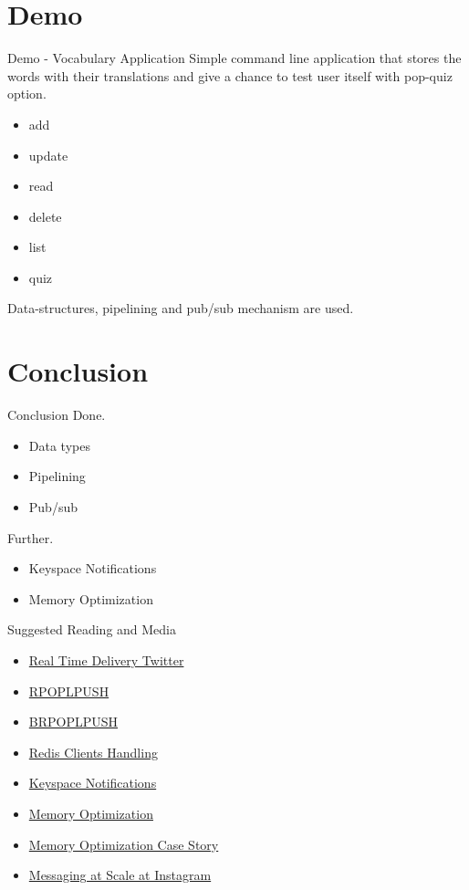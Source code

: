 \documentclass[10pt]{beamer}
\begin{document}
\section{Demo}
\begin{frame}[fragile]{Demo - Vocabulary Application}
  Simple command line application that stores the words with their translations
  and give a chance to test user itself with pop-quiz option.
  \begin{itemize}
    \item add
    \item update
    \item read
    \item delete
    \item list
    \item quiz
  \end{itemize}

  Data-structures, pipelining and pub/sub mechanism are used.
\end{frame}

\section{Conclusion}
\begin{frame}[fragile]{Conclusion}
  Done.
  \begin{itemize}
    \item Data types
    \item Pipelining
    \item Pub/sub
  \end{itemize}
  Further.
  \begin{itemize}
    \item Keyspace Notifications
    \item Memory Optimization
  \end{itemize}
\end{frame}

\begin{frame}{Suggested Reading and Media}
  \begin{itemize}
    \item \href{https://www.infoq.com/presentations/Real-Time-Delivery-Twitter}{Real Time Delivery Twitter}
    \item \href{https://redis.io/commands/rpoplpush}{RPOPLPUSH}
    \item \href{https://redis.io/https://redis.io/commands/brpoplpush}{BRPOPLPUSH}
    \item \href{https://redis.io/topics/clients}{Redis Clients Handling}
    \item \href{https://redis.io/topics/notifications}{Keyspace Notifications}
    \item \href{https://redis.io/topics/memory-optimization}{Memory Optimization}
    \item \href{https://davidcel.is/posts/the-story-of-my-redis-database/}{Memory Optimization Case Story}
    \item \href{https://youtu.be/E708csv4XgY}{Messaging at Scale at Instagram}
  \end{itemize}
\end{frame}
\end{document}
